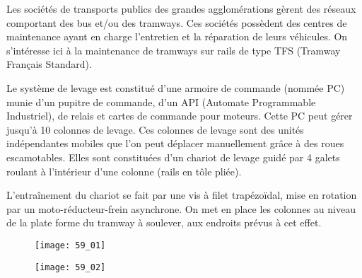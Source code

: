 \normaltrue \difficilefalse \tdifficilefalse
\correctionfalse

\setcounter{question}{0}

\ifcorrection
\else
{}
\fi

\ifprof
\else

Les sociétés de transports publics des grandes agglomérations gèrent des réseaux comportant des
bus et/ou des tramways. Ces sociétés possèdent des centres de maintenance ayant en charge
l’entretien et la réparation de leurs véhicules. %
On s'intéresse ici à la maintenance de tramways sur rails de type
TFS (Tramway Français Standard).


Le système de levage est constitué d’une armoire de commande (nommée PC) munie d’un pupitre
de commande, d’un API (Automate Programmable Industriel), de relais et cartes de commande
pour moteurs. Cette PC peut gérer jusqu’à 10 colonnes de levage. Ces colonnes de levage sont des unités indépendantes mobiles que l’on peut déplacer manuellement
grâce à des roues escamotables. Elles sont constituées d’un chariot de levage guidé par 4 galets roulant à l’intérieur d’une colonne (rails
en tôle pliée). 




L’entraînement du chariot se fait par une vis à filet trapézoïdal, mise en rotation par un moto-réducteur-frein asynchrone. On met en place les colonnes au
niveau de la plate forme du tramway à soulever, aux endroits prévus à cet effet.


\begin{figure}[H]
\centering
\texttt{[image: 59\_01]}
\end{figure}

\begin{figure}[H]
\centering
\texttt{[image: 59\_02]}
\end{figure}


